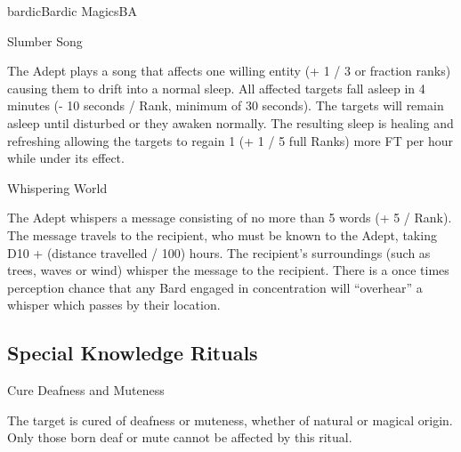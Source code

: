 \begin{college}[2.1]{bardic}{Bardic Magics}{BA}
\begin{spell}[S-13]{Slumber Song}

\begin{effects}
The Adept plays a song that affects one willing entity (+ 1 / 3 or
fraction ranks) causing them to drift into a normal sleep. All
affected targets fall asleep in 4 minutes (- 10 seconds / Rank,
minimum of 30 seconds).  The targets will remain asleep until
disturbed or they awaken normally. The resulting sleep is healing and
refreshing allowing the targets to regain 1 (+ 1 / 5 full Ranks) more
FT per hour while under its effect.
\end{effects}
\end{spell}

\begin{spell}[S-14]{Whispering World}

\begin{effects}
The Adept whispers a message consisting of no more than 5 words (+ 5 /
Rank). The message travels to the recipient, who must be known to the
Adept, taking D10 + (distance travelled / 100) hours. The recipient's
surroundings (such as trees, waves or wind) whisper the message to the
recipient. There is a once times perception chance that any Bard
engaged in concentration will ``overhear'' a whisper which passes by
their location.
\end{effects}
\end{spell}

\subsection{Special Knowledge Rituals}

\begin{ritual}[R-1]{Cure Deafness and Muteness}

\begin{effects}
The target is cured of deafness or muteness, whether of natural or
magical origin. Only those born deaf or mute cannot be affected by
this ritual.
\end{effects}
\end{ritual}


\end{college}
